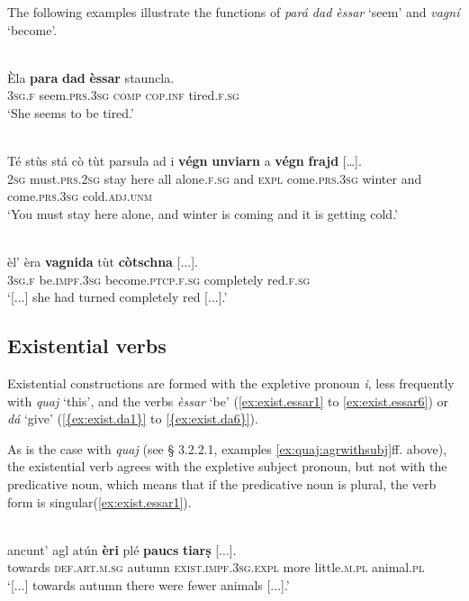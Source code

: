 The following examples illustrate the functions of \textit{pará dad èssar} `seem' and \textit{vagní} `become'.

\ea
\label{ex:cop:7}
\\
\gll Èla \textbf{para} \textbf{dad} \textbf{èssar} stauncla.   \\
\textsc{3sg.f} seem.\textsc{prs.3sg} \textsc{comp} \textsc{cop.inf} tired.\textsc{f.sg} \\
\glt `She seems to be tired.'
\z

\ea
\label{ex:cop:8}
 {\citealt[145]{Büchli1966}}\\
\gll    Té stùs stá cò tùt parsula ad i \textbf{végn} \textbf{unviarn} a \textbf{végn} \textbf{frajd} […].\\
    \textsc{2sg} must.\textsc{prs.2sg} stay here all alone.\textsc{f.sg} and \textsc{expl} come.\textsc{prs.3sg} winter and come.\textsc{prs.3sg} cold.\textsc{adj.unm}  \\
\glt `You must stay here alone, and winter is coming and it is getting cold.'
\z

\ea
\label{ex:cop:9}
\\
\gll  [...] èl’ èra \textbf{vagnida} tùt \textbf{còtschna} [...].\\
{} \textsc{3sg.f} be.\textsc{impf.3sg} become.\textsc{ptcp.f.sg} completely red.\textsc{f.sg}\\
\glt `[...] she had turned completely red [...].'
\z

\subsection{Existential verbs}
Existential constructions are formed with the expletive pronoun \textit{i}, less frequently with \textit{quaj} `this', and the verbs \textit{èssar} `be' (\ref{ex:exist.essar1} to \ref{ex:exist.essar6}) or \textit{dá} `give' (\ref{{ex:exist.da1}} to \ref{{ex:exist.da6}}).

As is the case with \textit{quaj} (see § 3.2.2.1, examples \ref{ex:quaj:agrwithsubj}ff. above), the existential verb agrees with the expletive subject pronoun, but not with the predicative noun, which means that if the predicative noun is plural, the verb form is singular(\ref{ex:exist.essar1}).

\ea
\label{ex:exist.essar1}
\\
\gll [...] ancunt’ agl atún \textbf{èri} plé \textbf{paucs} \textbf{tiarṣ} [...].\\
 {} towards \textsc{def.art.m.sg} autumn \textsc{exist.impf.3sg.expl} more little.\textsc{m.pl} animal.\textsc{pl} \\
\glt `[...] towards autumn there were fewer animals [...].'
\z

